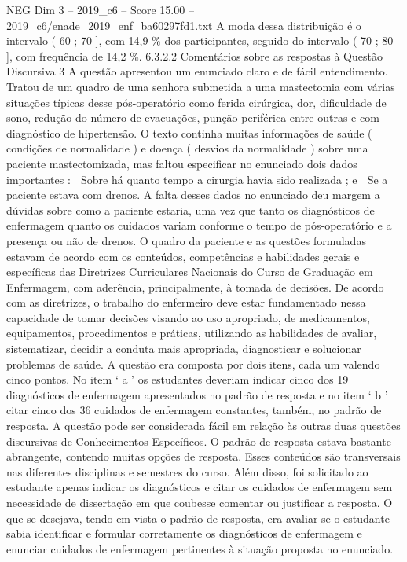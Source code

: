 \begin{textsample}{NEG Dim 3 – 2019\_c6 – Score 15.00 – 2019\_c6/enade\_2019\_enf\_ba60297fd1.txt}
A moda dessa distribuição é o intervalo ( 60 ; 70 ], com 14,9 \% dos participantes, seguido do intervalo ( 70 ; 80 ], com frequência de 14,2 \%. 6.3.2.2 Comentários sobre as respostas à Questão Discursiva 3 A questão apresentou um enunciado claro e de fácil entendimento.
Tratou de um quadro de uma senhora submetida a uma mastectomia com várias situações típicas desse pós-operatório como ferida cirúrgica, dor, dificuldade de sono, redução do número de evacuações, punção periférica entre outras e com diagnóstico de hipertensão.
O texto continha muitas informações de saúde ( condições de normalidade ) e doença ( desvios da normalidade ) sobre uma paciente mastectomizada, mas faltou especificar no enunciado dois dados importantes :  Sobre há quanto tempo a cirurgia havia sido realizada ; e  Se a paciente estava com drenos.
A falta desses dados no enunciado deu margem a dúvidas sobre como a paciente estaria, uma vez que tanto os diagnósticos de enfermagem quanto os cuidados variam conforme o tempo de pós-operatório e a presença ou não de drenos.
O quadro da paciente e as questões formuladas estavam de acordo com os conteúdos, competências e habilidades gerais e específicas das Diretrizes Curriculares Nacionais do Curso de Graduação em Enfermagem, com aderência, principalmente, à tomada de decisões.
De acordo com as diretrizes, o trabalho do enfermeiro deve estar fundamentado nessa capacidade de tomar decisões visando ao uso apropriado, de medicamentos, equipamentos, procedimentos e práticas, utilizando as habilidades de avaliar, sistematizar, decidir a conduta mais apropriada, diagnosticar e solucionar problemas de saúde.
A questão era composta por dois itens, cada um valendo cinco pontos.
No item ‘ a ’ os estudantes deveriam indicar cinco dos 19 diagnósticos de enfermagem apresentados no padrão de resposta e no item ‘ b ’ citar cinco dos 36 cuidados de enfermagem constantes, também, no padrão de resposta.
A questão pode ser considerada fácil em relação às outras duas questões discursivas de Conhecimentos Específicos.
O padrão de resposta estava bastante abrangente, contendo muitas opções de resposta.
Esses conteúdos são transversais nas diferentes disciplinas e semestres do curso.
Além disso, foi solicitado ao estudante apenas indicar os diagnósticos e citar os cuidados de enfermagem sem necessidade de dissertação em que coubesse comentar ou justificar a resposta.
O que se desejava, tendo em vista o padrão de resposta, era avaliar se o estudante sabia identificar e formular corretamente os diagnósticos de enfermagem e enunciar cuidados de enfermagem pertinentes à situação proposta no enunciado.

\end{textsample}
